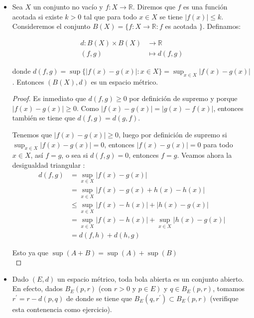 \begin{itemize}[leftmargin=*]
\begin{proof}
    \end{proof}

 

    \item Sea $X$ un conjunto no vacío y $f: X \rightarrow \mathbb{R}$. Diremos que $f$ es una función acotada si existe $k>0$ tal que para todo $x \in X$ se tiene $|f(x)| \leq k$. Consideremos el conjunto $B(X)=\{f: X \rightarrow \mathbb{R}: f$ es acotada $\}$. Definamos:

        $$
        \begin{aligned}
        d: B(X) \times B(X) & \rightarrow \mathbb{R} \\
        (f, g) & \mapsto d(f, g)
        \end{aligned}
        $$

        donde $d(f, g)=\sup \{|f(x)-g(x)|: x \in X\}=\sup _{x \in X}|f(x)-g(x)|$. Entonces $(B(X), d)$ es un espacio métrico.\\

        \begin{proof}
            Es inmediato que $d(f,g)\geq 0$ por definición de supremo y porque $|f(x)-g(x)|\geq 0$. Como $|f(x)-g(x)|=|g(x)-f(x)|$, entonces también se tiene que $d(f,g)=d(g,f)$.

            Tenemos que $|f(x)-g(x)|\geq 0$, luego por definición de supremo si $\sup_{x \in X}|f(x)-g(x)|=0$, entonces $|f(x)-g(x)|=0$ para todo $x\in X$, así $f=g$, o sea si $d(f,g)=0$, entonces $f=g$. Veamos ahora la desigualdad triangular :
            \begin{align*}
                d(f,g)&=\sup_{x\in X}|f(x)-g(x)|\\
                &=\sup_{x\in X}|f(x)-g(x)+h(x)-h(x)|\\
                &\leq \sup_{x\in X}|f(x)-h(x)|+|h(x)-g(x)|\\
                &=\sup_{x\in X}|f(x)-h(x)|+\sup_{x\in X}|h(x)-g(x)|\\
                &=d(f,h)+d(h,g)
            \end{align*}

            Esto ya que $\sup (A+B)=\sup(A)+\sup (B)$\\
            
        \end{proof}

        \item  Dado $(E, d)$ un espacio métrico, toda bola abierta es un conjunto abierto. En efecto, dados $B_E(p, r)$ (con $r>0$ y $\left.p \in E\right)$ y $q \in B_E(p, r)$, tomamos $r^{\prime}=r-d(p, q)$ de donde se tiene que $B_E\left(q, r^{\prime}\right) \subset B_E(p, r)$ (verifique esta contenencia como ejercicio).\\
       

\end{itemize}
